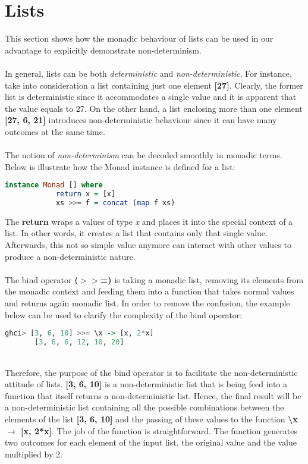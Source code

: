 \documentclass[a4paper, onecolumn]{article}
\begin{document}
    \section{Lists}
    This section shows how the monadic behaviour of lists can be used in our advantage to explicitly demonstrate non-determinism. \\ \\
    In general, lists can be both \textit{deterministic} and \textit{non-deterministic}. For instance, take into consideration a list containing just one element \textbf{[27]}. Clearly, the former list is deterministic since it accommodates a single value and it is apparent that the value equals to 27. On the other hand, a list enclosing more than one element \textbf{[27, 6, 21]} introduces non-deterministic behaviour since it can have many outcomes at the same time. \\ \\
    The notion of \textit{non-determinism} can be decoded smoothly in monadic terms. Below is illustrate how the Monad instance is defined for a list: \\
    \begin{lstlisting}[language=Haskell]
        instance Monad [] where
            return x = [x]
            xs >>= f = concat (map f xs)
    \end{lstlisting} 
    The \textbf{return} wraps a values of type \textit{x} and places it into the special context of a list. In other words, it creates a list that contains only that single value. Afterwards, this not so simple value anymore can interact with other values to produce a non-deterministic nature.   \\ \\
    The bind operator \textbf{($>>$=)} is taking a monadic list, removing its elements from the monadic context and feeding them into a function that takes normal values and returns again monadic list.  In order to remove the confusion, the example below can be used to clarify the complexity of the bind operator: \\
    \begin{lstlisting}[language=Haskell]
       ghci> [3, 6, 10] >>= \x -> [x, 2*x]
       [3, 6, 6, 12, 10, 20]
    \end{lstlisting} \\
    Therefore, the purpose of the bind operator is to facilitate the non-deterministic attitude of lists. \textbf{[3, 6, 10]} is a non-deterministic list that is being feed into a function that itself returns a non-deterministic list. Hence, the final result will be a non-deterministic list containing all the possible combinations between the elements of the list \textbf{[3, 6, 10]} and the passing of these values to the function \textbf{\textbackslash x $\rightarrow$ [x, 2*x]}. The job of the function is straightforward. The function generates two outcomes for each element of the input list, the original value and the value multiplied by 2. 
    
\end{document}
